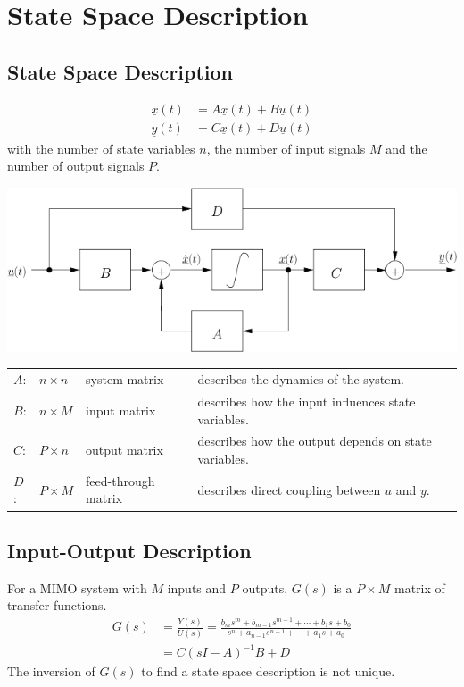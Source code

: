 \section{State Space Description}

\subsection{State Space Description}

\begin{minipage}{10cm}
    \begin{align*}
        \dot{\underline{x}}(t) &= A \underline{x}(t) + B \underline{u}(t) \\
        \underline{y}(t) &= C \underline{x}(t) + D\underline{u}(t)
    \end{align*}
    with the number of state variables $n$, the number of input signals $M$ and the number of output signals $P$.
\end{minipage}
\hspace{0.5cm}
\begin{minipage}{8cm}
    \centering
    \includegraphics[width=\linewidth]{./bilder/zrd-schema.png}
\end{minipage}

\begin{tabularx}{\linewidth}{llll}
    $A$: & $n \times n$ & system matrix & describes the dynamics of the system. \\
    $B$: & $n \times M$ & input matrix & describes how the input influences state variables. \\
    $C$: & $P \times n$ & output matrix & describes how the output depends on state variables. \\
    $D$: & $P \times M$ & feed-through matrix & describes direct coupling between $u$ and $y$. 
\end{tabularx}

\subsection{Input-Output Description}
For a MIMO system with $M$ inputs and $P$ outputs, $G(s)$ is a $P \times M$ matrix of transfer functions.
\begin{align*}
    G(s) &= \frac{Y(s)}{U(s)} = \frac{b_{m} s^{m} + b_{m-1} s^{m-1} +\cdots+b_{1} s 
    + b_{0}}{s^{n} + a_{n-1} s^{n-1} + \cdots + a_{1} s + a_{0}} \\
    &= C (sI-A)^{-1} B + D
\end{align*}
The inversion of $G(s)$ to find a state space description is not unique.

